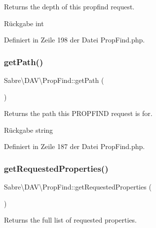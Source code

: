 Returns the depth of this propfind request.

\begin{DoxyReturn}{Rückgabe}
int 
\end{DoxyReturn}


Definiert in Zeile 198 der Datei Prop\+Find.\+php.

\mbox{\label{class_sabre_1_1_d_a_v_1_1_prop_find_a6a2464aa10192f6ede120ff6fda2f0a3}} 
\subsubsection{\texorpdfstring{get\+Path()}{getPath()}}
{\footnotesize\ttfamily Sabre\textbackslash{}\+D\+A\+V\textbackslash{}\+Prop\+Find\+::get\+Path (\begin{DoxyParamCaption}{ }\end{DoxyParamCaption})}

Returns the path this P\+R\+O\+P\+F\+I\+ND request is for.

\begin{DoxyReturn}{Rückgabe}
string 
\end{DoxyReturn}


Definiert in Zeile 187 der Datei Prop\+Find.\+php.

\mbox{\label{class_sabre_1_1_d_a_v_1_1_prop_find_ae77234fd2b849cc854b5621441263571}} 
\subsubsection{\texorpdfstring{get\+Requested\+Properties()}{getRequestedProperties()}}
{\footnotesize\ttfamily Sabre\textbackslash{}\+D\+A\+V\textbackslash{}\+Prop\+Find\+::get\+Requested\+Properties (\begin{DoxyParamCaption}{ }\end{DoxyParamCaption})}

Returns the full list of requested properties.

